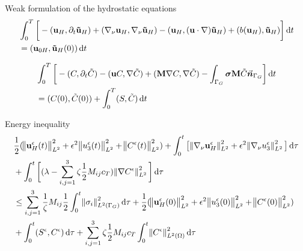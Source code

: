 \documentclass{beamer}
\newcommand*\diff{\mathop{}\!\mathrm{d}}
\begin{document}
\begin{frame}{Weak formulation of the hydrostatic equations}
\changefontsizes{10pt}
  \begin{equation}
    \begin{split}
      & \int_0^T \bigg[ -(\mathbf{u}_H, \partial_t \mathbf{\tilde{u}}_H) + (\nabla_\nu \mathbf{u}_H, \nabla_\nu \mathbf{\tilde{u}}_H) - (\mathbf{u}_H, (\mathbf{u} \cdot \nabla) \mathbf{\tilde{u}}_H) + (b(\mathbf{u}_H), \mathbf{\tilde{u}}_H) \bigg ] \diff t \\
      & = (\mathbf{u}_{0H}, \mathbf{\tilde{u}}_H(0)) \diff t \raisetag{15pt}\label{hydrostaticWF_U}
    \end{split}
  \end{equation}
  
    \begin{equation}
    \begin{split}
      & \int_0^T \bigg[ -(C, \partial_t \tilde{C}) -(\mathbf{u}C, \nabla \tilde{C}) +  (\mathbf{M} \nabla C, \nabla \tilde{C}) - \int_{\Gamma_G} \boldsymbol{\sigma} \mathbf{M} \tilde{C} \vec{\boldsymbol{n}}_{\Gamma_G} \bigg ] \diff t \\
      & = (C(0), \tilde{C}(0)) + \int_0^T (S,\tilde{C}) \diff t \raisetag{20pt} \label{hydrostaticWF_C}
    \end{split}
  \end{equation}
  
\end{frame}

\begin{frame}{Energy inequality}
    \changefontsizes{10pt}
  \begin{equation}
    \begin{split}  
    & \frac{1}{2} (\norm{\mathbf{u}_H^\epsilon (t)}_{L^2}^2 + \epsilon ^ 2 \norm{u_3^\epsilon (t)}_{L^2}^2 + \norm{C^\epsilon (t)}_{L^2}^2) + \int_0 ^ t \big [\norm{\nabla_\nu \mathbf{u}_H^\epsilon}_{L^2}^2 + \epsilon ^ 2 \norm{\nabla_\nu u_3^\epsilon}_{L^2}^2 \big ] \diff \tau \\
    & + \int_0 ^ t \bigg[ (\lambda - \sum_{i,j = 1}^3 \zeta \frac{1}{2} M_{ij} c_T) \norm{\nabla C^\epsilon}_{L^2}^2  \bigg] \diff \tau \\
    & \leq \sum_{i,j = 1}^3 \frac{1}{\zeta} M_{ij} \frac{1}{2} \int_0 ^ t \norm{\sigma_i}^2 _{L^2 (\Gamma_G)} \diff \tau + \frac{1}{2} (\norm{\mathbf{u}_H^\epsilon (0)}_{L^2}^2 + \epsilon ^ 2 \norm{u_3^\epsilon (0)}_{L^2}^2 + \norm{C^\epsilon (0)}_{L^2}^2) \\
    & + \int_0^t (S^\epsilon,C^\epsilon) \diff \tau + \sum_{i,j = 1}^3 \zeta \frac{1}{2} M_{ij} c_T  \int_0 ^ t \norm{C^\epsilon}^2 _{L^2 (\Omega) } \diff \tau \raisetag{90pt} \label{finalformEIEQ}
    \end{split}
  \end{equation} 
\end{frame}
\end{document}
